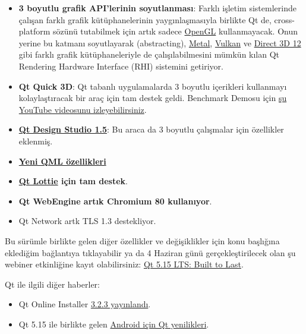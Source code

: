 \documentclass[11pt]{article}
\begin{document}
\begin{itemize}
\item \textbf{3 boyutlu grafik API'lerinin soyutlanması}: Farklı işletim sistemlerinde
çalışan farklı grafik kütüphanelerinin yaygınlaşmasıyla birlikte Qt de,
cross-platform sözünü tutabilmek için artık sadece \href{https://www.khronos.org/opengl/}{OpenGL} kullanmayacak.
Onun yerine bu katmanı soyutlayarak (abstracting), \href{https://developer.apple.com/metal/}{Metal}, \href{https://www.khronos.org/vulkan/}{Vulkan} ve \href{https://docs.microsoft.com/en-us/windows/win32/direct3d12/direct3d-12-graphics}{Direct
3D 12} gibi farklı grafik kütüphaneleriyle de çalışılabilmesini mümkün kılan
Qt Rendering Hardware Interface (RHI) sistemini getiriyor.
\item \textbf{Qt Quick 3D}: Qt tabanlı uygulamalarda 3 boyutlu içerikleri kullanmayı
kolaylaştıracak bir araç için tam destek geldi. Benchmark Demosu için \href{https://www.youtube.com/watch?v=wuRH-lr\_XBA}{şu
YouTube videosunu izleyebilirsiniz}.
\item \textbf{\href{https://www.qt.io/blog/qt-design-studio-1.5-released}{Qt Design Studio 1.5}}: Bu araca da 3 boyutlu çalışmalar için özellikler
eklenmiş.
\item \textbf{\href{https://www.qt.io/blog/new-qml-language-features-in-qt-5.15}{Yeni QML özellikleri}}
\item \textbf{\href{https://doc.qt.io/qt-5/qtlottieanimation-index.html}{Qt Lottie} için tam destek}.
\item \textbf{Qt WebEngine artık Chromium 80 kullanıyor}.
\item Qt Network artk TLS 1.3 destekliyor.
\end{itemize}

Bu sürümle birlikte gelen diğer özellikler ve değişiklikler için konu
başlığına eklediğim bağlantıya tıklayabilir ya da 4 Haziran günü
gerçekleştirilecek olan şu webiner etkinliğine kayıt olabilirsiniz: \href{https://www.qt.io/events/qt-515-lts-built-to-last-1589807096}{Qt 5.15
LTS: Built to Last}.

Qt ile ilgili diğer haberler:
\begin{itemize}
\item Qt Online Installer \href{https://www.qt.io/blog/qt-online-installer-3.2.3-released}{3.2.3 yayınlandı}.
\item Qt 5.15 ile birlikte gelen \href{https://www.qt.io/blog/whats-new-with-qt-for-android}{Android için Qt yenilikleri}.
\end{itemize}
\end{document}
